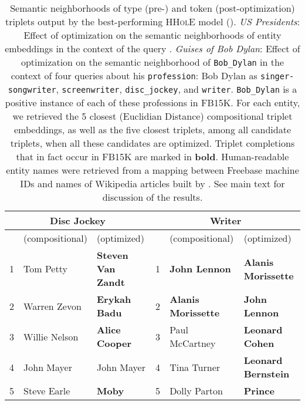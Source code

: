 \documentclass[a4paper,10pt]{article}
\begin{document}
\begin{table*}
\begin{tabular}{lll | lll}
 \\
 \multicolumn{3}{c}{\small \textbf{Disc Jockey} } & \multicolumn{3}{c}{\small \textbf{Writer} }  \\ \hline
 \multicolumn{1}{l}{\small } & \multicolumn{1}{l}{\small \textbf{} (compositional)} & \multicolumn{1}{l|}{\small \textbf{} (optimized)} & \multicolumn{1}{l}{\small } & \multicolumn{1}{l}{\small \textbf{} (compositional)} & \multicolumn{1}{l}{\small \textbf{} (optimized)} \\ \hline 
 {\scriptsize 1 } & { \scriptsize Tom Petty} & { \scriptsize \textbf{Steven Van Zandt} } &  {\scriptsize 1 } & { \scriptsize \textbf{John Lennon} } & { \scriptsize \textbf{Alanis Morissette} } \\
 {\scriptsize 2 } & { \scriptsize Warren Zevon } & { \scriptsize \textbf{Erykah Badu} }&  {\scriptsize 2 } & { \scriptsize \textbf{Alanis Morissette} } & { \scriptsize \textbf{John Lennon}}\\ 
 {\scriptsize 3 } & { \scriptsize Willie Nelson } & { \scriptsize \textbf{Alice Cooper} } &  {\scriptsize 3 } & { \scriptsize Paul McCartney } & { \scriptsize \textbf{Leonard Cohen} }\\ 
 {\scriptsize 4 } & { \scriptsize John Mayer } & { \scriptsize John Mayer} &  {\scriptsize 4 } & { \scriptsize Tina Turner } & { \scriptsize \textbf{Leonard Bernstein}}\\ 
 {\scriptsize 5 } & { \scriptsize Steve Earle } & { \scriptsize \textbf{Moby} } &  {\scriptsize 5 } & { \scriptsize Dolly Parton } & { \scriptsize \textbf{Prince} }\\ \hline  
 \end{tabular} 
 \caption{Semantic neighborhoods of type (pre-) and token (post-optimization) triplets output by the best-performing \textsc{HHolE} model (). \emph{US Presidents}: Effect of optimization on the semantic neighborhoods of entity embeddings in the context of the query . \emph{Guises of Bob Dylan}: Effect of optimization on the semantic neighborhood of \texttt{Bob\_{}Dylan} in the context of four queries about his \texttt{profession}: Bob Dylan as \texttt{singer-songwriter}, \texttt{screenwriter}, \texttt{disc\_{}jockey}, and \texttt{writer}. \texttt{Bob\_{}Dylan} is a positive instance of each of these professions in FB15K. For each entity, we retrieved the 5 closest (Euclidian Distance) compositional triplet embeddings, as well as the five closest triplets, among all candidate triplets, when all these candidates are optimized.  
Triplet completions that in fact occur in FB15K are marked in \textbf{bold}. Human-readable entity names were retrieved from a mapping between Freebase machine IDs and names of Wikipedia articles built by \citet{ling2012ner}. See main text for discussion of the results.
} \label{table_sem_neighborhoods}
 \end{table*} 
\end{document}

